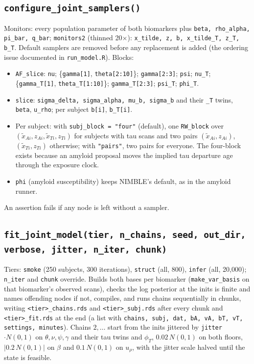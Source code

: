 \documentclass[11pt]{article}
\newcommand{\code}[1]{\texttt{#1}}
\begin{document}
\subsection{\code{configure\_joint\_samplers()}}\label{sec:samplers}

Monitors: every population parameter of both biomarkers plus \code{beta,
rho\_alpha, pi\_bar, q\_bar}; \code{monitors2} (thinned 20$\times$):
\code{x\_tilde, z, b, x\_tilde\_T, z\_T, b\_T}. Default samplers are removed before
any replacement is added (the ordering issue documented in \code{run\_model.R}).
Blocks:
\begin{itemize}[nosep]
\item \code{AF\_slice}: \code{nu}; \{\code{gamma[1]}, \code{theta[2:10]}\}; \code{gamma[2:3]}; \code{psi};
\code{nu\_T}; \{\code{gamma\_T[1]}, \code{theta\_T[1:10]}\}; \code{gamma\_T[2:3]}; \code{psi\_T}; \code{phi\_T}.
\item \code{slice}: \code{sigma\_delta, sigma\_alpha, mu\_b, sigma\_b} and their
\code{\_T} twins, \code{beta}, \code{u\_rho}; per subject \code{b[i]}, \code{b\_T[i]}.
\item Per subject: with \code{subj\_block = "four"} (default), one \code{RW\_block}
over $(\tilde x_{Ai},z_{Ai},\tilde x_{Ti},z_{Ti})$ for subjects with tau scans and two
pairs $(\tilde x_{Ai},z_{Ai})$, $(\tilde x_{Ti},z_{Ti})$ otherwise; with \code{"pairs"},
two pairs for everyone. The four-block exists because an amyloid proposal moves the
implied tau departure age through the exposure clock.
\item \code{phi} (amyloid susceptibility) keeps NIMBLE's default, as in the amyloid runner.
\end{itemize}
An assertion fails if any node is left without a sampler.

\subsection{\code{fit\_joint\_model(tier, n\_chains, seed, out\_dir, verbose, jitter, n\_iter, chunk)}}

Tiers: \code{smoke} (250 subjects, 300 iterations), \code{struct} (all, 800),
\code{infer} (all, 20{,}000); \code{n\_iter} and \code{chunk} override. Builds both
bases per biomarker (\code{make\_var\_basis} on that biomarker's observed scans),
checks the log posterior at the inits is finite and names offending nodes if not,
compiles, and runs chains sequentially in chunks, writing
\code{<tier>\_chains.rds} and \code{<tier>\_subj.rds} after every chunk and
\code{<tier>\_fit.rds} at the end (a list with \code{chains, subj, dat, bA, vA, bT, vT,
settings, minutes}). Chains $2,\dots$ start from the inits jittered by
\code{jitter}$\cdot N(0,1)$ on $\theta,\nu,\psi,\gamma$ and their tau twins and $\phi_T$,
$0.02\,N(0,1)$ on both floors, $|0.2\,N(0,1)|$ on $\beta$ and $0.1\,N(0,1)$ on $u_\rho$,
with the jitter scale halved until the state is feasible.
\end{document}
